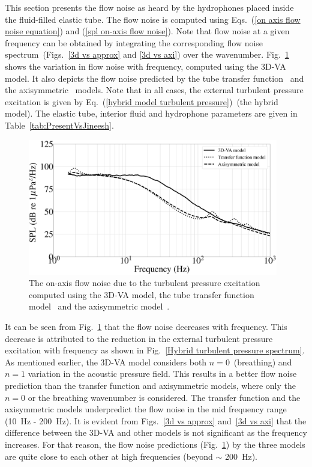 \documentclass[11pt,cleanfoot]{asme2ej}
\begin{document}
This section presents the flow noise as heard by the hydrophones placed inside the fluid-filled elastic tube. The flow noise is computed using Eqs.~(\ref{on axis flow noise equation}) and (\ref{spl on-axis flow noise}). Note that flow noise at a given frequency can be obtained by integrating the corresponding flow noise spectrum~(Figs.~\ref{3d vs approx} and \ref{3d vs axi}) over the wavenumber. Fig.~\ref{3d vs knight vs jineesh} shows the variation in flow noise with frequency, computed using the 3D-VA model. It also depicts the flow noise predicted by the tube transfer function~\cite{knight1996} and the axisymmetric~\cite{jineesh2013} models. Note that in all cases, the external turbulent pressure excitation is given by Eq.~(\ref{hybrid model turbulent pressure})~(the hybrid model). The elastic tube, interior fluid and hydrophone parameters are given in Table~\ref{tab:PresentVsJineesh}.
\begin{figure}
    \centerline{
    \includegraphics[width=4.3in]{Flow_noise_comparison_3D_vs_Knight_Jineesh.eps}}
    \caption{The on-axis flow noise due to the turbulent pressure excitation computed using the 3D-VA model, the tube transfer function model~\cite{knight1996} and the axisymmetric model~\cite{jineesh2013}.} 
    \label{3d vs knight vs jineesh}
\end{figure}
 It can be seen from Fig.~\ref{3d vs knight vs jineesh} that the flow noise decreases with frequency. This decrease is attributed to the reduction in the external turbulent pressure excitation with frequency as shown in Fig.~\ref{Hybrid turbulent pressure spectrum}. As mentioned earlier, the 3D-VA model considers both $n=0$~(breathing) and $n=1$ variation in the acoustic pressure field. This results in a better flow noise prediction than the transfer function and axisymmetric models, where only the $n=0$ or the breathing wavenumber is considered. The transfer function and the axisymmetric models underpredict the flow noise in the mid frequency range (10~Hz - 200~Hz). It is evident from Figs.~\ref{3d vs approx} and~\ref{3d vs axi} that the difference between the 3D-VA and other models is not significant as the frequency increases. For that reason, the flow noise predictions (Fig.~\ref{3d vs knight vs jineesh}) by the three models are quite close to each other at high frequencies (beyond $\sim$ 200~Hz).
\end{document}
